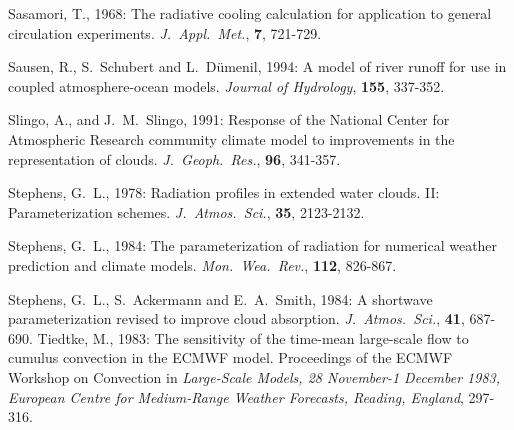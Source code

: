 Sasamori, T., 1968: The radiative cooling calculation
for application to general circulation
experiments. {\it J.~Appl.~Met.}, {\bf 7}, 721-729.

Sausen, R., S.~Schubert and L.~D\"umenil, 1994: A
model of river runoff for use in coupled
atmosphere-ocean models. {\it Journal of Hydrology},
{\bf 155}, 337-352.

Slingo, A., and J.~M.~Slingo, 1991: Response of the National Center for Atmospheric Research
community climate model to improvements in the representation of clouds. {\it
J.~Geoph.~Res.}, {\bf 96}, 341-357.


Stephens, G.~L., 1978: Radiation profiles in extended water clouds. II: Parameterization
schemes. {\it J.~Atmos.~Sci.}, {\bf 35}, 2123-2132.

Stephens, G.~L., 1984: The parameterization of
radiation for numerical weather prediction
and
climate models. {\it Mon.~Wea.~Rev.}, {\bf 112},
826-867.

Stephens, G.~L., S.~Ackermann and E.~A.~Smith, 1984: A shortwave parameterization revised
to improve cloud absorption. {\it J.~Atmos.~Sci.}, {\bf 41}, 687-690.
Tiedtke, M., 1983: The sensitivity of the time-mean large-scale flow to cumulus convection in the ECMWF model. Proceedings of the ECMWF Workshop on Convection in {\it Large-Scale Models, 28 November-1 December 1983, European Centre for Medium-Range Weather Forecasts, Reading, England}, 297-316.

